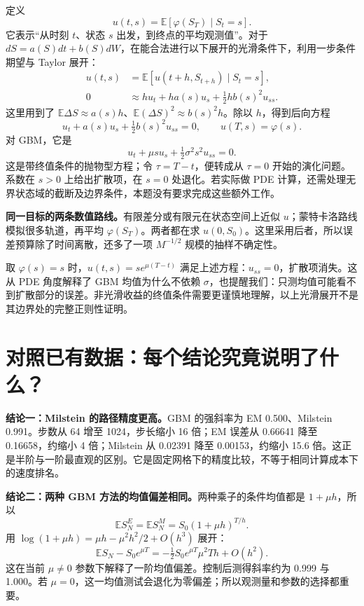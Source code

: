 \documentclass[11pt,a4paper,fontset=none]{ctexart}
\newcommand{\E}{\mathbb E}
\begin{document}
定义
\[
u(t,s)=\E[\varphi(S_T)\mid S_t=s].
\]
它表示“从时刻 $t$、状态 $s$ 出发，到终点的平均观测值”。对于 $dS=a(S)dt+b(S)dW$，在能合法进行以下展开的光滑条件下，利用一步条件期望与 Taylor 展开：
\begin{align*}
u(t,s)&=\E[u(t+h,S_{t+h})\mid S_t=s],\\
0&\approx h u_t+h a(s)u_s+\tfrac12h b(s)^2u_{ss}.
\end{align*}
这里用到了 $\E\Delta S\approx a(s)h$、$\E(\Delta S)^2\approx b(s)^2h$。除以 $h$，得到后向方程
\begin{equation}\label{eq:backward}
u_t+a(s)u_s+\tfrac12b(s)^2u_{ss}=0,
\qquad u(T,s)=\varphi(s).
\end{equation}
对 GBM，它是
\[
u_t+\mu s u_s+\tfrac12\sigma^2s^2u_{ss}=0.
\]
这是带终值条件的抛物型方程；令 $\tau=T-t$，便转成从 $\tau=0$ 开始的演化问题。系数在 $s>0$ 上给出扩散项，在 $s=0$ 处退化。若实际做 PDE 计算，还需处理无界状态域的截断及边界条件，本题没有要求完成这些额外工作。

\textbf{同一目标的两条数值路线。}有限差分或有限元在状态空间上近似 $u$；蒙特卡洛路线模拟很多轨道，再平均 $\varphi(S_T)$。两者都在求 $u(0,S_0)$。这里采用后者，所以误差预算除了时间离散，还多了一项 $M^{-1/2}$ 规模的抽样不确定性。

取 $\varphi(s)=s$ 时，$u(t,s)=s e^{\mu(T-t)}$ 满足上述方程：$u_{ss}=0$，扩散项消失。这从 PDE 角度解释了 GBM 均值为什么不依赖 $\sigma$，也提醒我们：只测均值可能看不到扩散部分的误差。非光滑收益的终值条件需要更谨慎地理解，以上光滑展开不是其边界处的完整正则性证明。

\newpage
\section{对照已有数据：每个结论究竟说明了什么？}\label{sec:readresults}
\textbf{结论一：Milstein 的路径精度更高。}GBM 的强斜率为 EM 0.500、Milstein 0.991。步数从 64 增至 1024，步长缩小 16 倍；EM 误差从 0.66641 降至 0.16658，约缩小 4 倍；Milstein 从 0.02391 降至 0.00153，约缩小 15.6 倍。这正是半阶与一阶最直观的区别。它是固定网格下的精度比较，不等于相同计算成本下的速度排名。

\textbf{结论二：两种 GBM 方法的均值偏差相同。}两种乘子的条件均值都是 $1+\mu h$，所以
\[
\E S_N^E=\E S_N^M=S_0(1+\mu h)^{T/h}.
\]
用 $\log(1+\mu h)=\mu h-\mu^2h^2/2+O(h^3)$ 展开：
\[
\E S_N-S_0e^{\mu T}
=-\tfrac12 S_0e^{\mu T}\mu^2T h+O(h^2).
\]
这在当前 $\mu\ne0$ 参数下解释了一阶均值偏差。控制后测得斜率约为 0.999 与 1.000。若 $\mu=0$，这一均值测试会退化为零偏差；所以观测量和参数的选择都重要。
\end{document}
